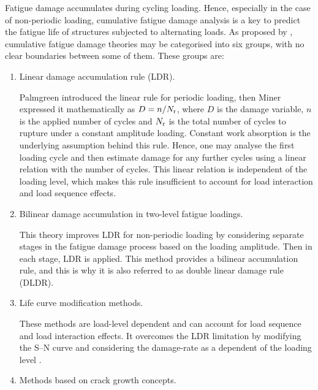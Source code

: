 Fatigue damage accumulates during cycling loading. Hence, especially in the case of non-periodic loading, cumulative fatigue damage analysis is a key to predict the fatigue life of structures subjected to alternating loads. As proposed by \parencite{fatemi1998cumulative}, cumulative fatigue damage theories may be categorised into six groups, with no clear boundaries between some of them. These groups are:

\begin{enumerate}

	\item Linear damage accumulation rule (LDR).

	      Palmgreen introduced the linear rule for periodic loading, then Miner expressed it mathematically as $D = n / {N_{\rm r}} $, where $D$ is the damage variable, $n$ is the applied number of cycles and ${N_{\rm r}}$ is the total number of cycles to rupture under a constant amplitude loading. Constant work absorption is the underlying assumption behind this rule. Hence, one may analyse the first loading cycle and then estimate damage for any further cycles using a linear relation with the number of cycles. This linear relation is independent of the loading level, which makes this rule insufficient to account for load interaction and load sequence effects.

	\item Bilinear damage accumulation in two-level fatigue loadings.

	      This theory improves LDR for non-periodic loading by considering separate stages in the fatigue damage process based on the loading amplitude. Then in each stage, LDR is applied. This method provides a bilinear accumulation rule, and this is why it is also referred to as double linear damage rule (DLDR).

	\item Life curve modification methods.

	      These methods are load-level dependent and can account for load sequence and load interaction effects. It overcomes the LDR limitation by modifying the S--N curve and considering the damage-rate as a dependent of the loading level \parencite{fatemi1998cumulative}.

	\item Methods based on crack growth concepts.


\end{enumerate}
